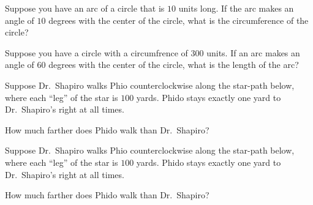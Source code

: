\documentclass[noauthor,nooutcomes]{ximera}
\author{Bart Snapp}
\begin{document}
\maketitle



   

\begin{exercise}
 Suppose you have an arc of a circle that is $10$ units long. If the
 arc makes an angle of $10$ degrees with the center of the circle,
 what is the circumference of the circle?
\end{exercise}



\begin{exercise}
 Suppose you have a circle with a circumfrence of $300$ units. If an
 arc makes an angle of $60$ degrees with the center of the circle,
 what is the length of the arc?
\end{exercise}







\begin{exercise}
  Suppose Dr.\ Shapiro walks Phio counterclockwise along the star-path
  below, where each ``leg'' of the star is $100$ yards.  Phido stays
  exactly one yard to Dr.\ Shapiro's right at all times.
  \begin{center}
  \end{center}
  How much farther does Phido walk than
  Dr.\ Shapiro? 
\end{exercise}


\begin{exercise}
  Suppose Dr.\ Shapiro walks Phio counterclockwise along the star-path
  below, where each ``leg'' of the star is $100$ yards.  Phido stays
  exactly one yard to Dr.\ Shapiro's right at all times.
  \begin{center}
  \end{center}
  How much farther does Phido walk than
  Dr.\ Shapiro? 
\end{exercise}
\end{document}
